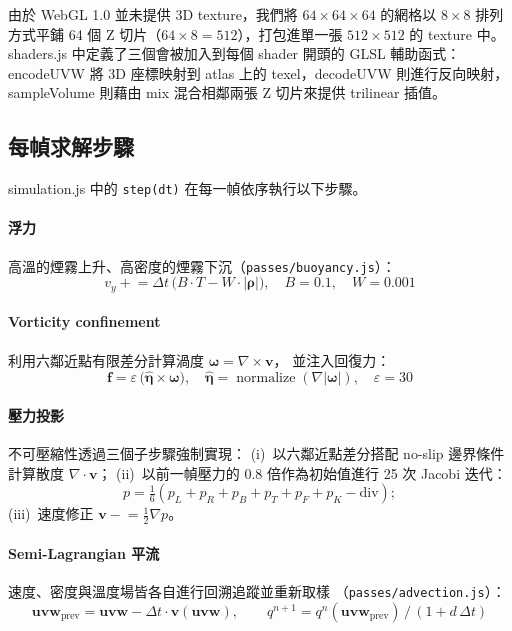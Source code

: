 \documentclass[a4paper, 12pt]{article}
\begin{document}
由於 WebGL 1.0 並未提供 3D texture，我們將 $64\times64\times64$ 的網格以
$8\times8$ 排列方式平鋪 64 個 Z 切片（$64\times8=512$），打包進單一張
$512\times512$ 的 texture 中。
shaders.js 中定義了三個會被加入到每個 shader 開頭的 GLSL 輔助函式：
encodeUVW 將 3D 座標映射到 atlas 上的 texel，decodeUVW 則進行反向映射，
sampleVolume 則藉由 mix 混合相鄰兩張 Z 切片來提供 trilinear 插值。

\subsection{每幀求解步驟}

simulation.js 中的 \texttt{step(dt)} 在每一幀依序執行以下步驟。

\paragraph{浮力}
高溫的煙霧上升、高密度的煙霧下沉（\texttt{passes/buoyancy.js}）：
\[
  v_y \mathrel{+}= \Delta t\,\bigl(B\cdot T - W\cdot|\boldsymbol{\rho}|\bigr),
  \quad B=0.1,\quad W=0.001
\]

\paragraph{Vorticity confinement}
利用六鄰近點有限差分計算渦度 $\boldsymbol{\omega}=\nabla\times\mathbf{v}$，
並注入回復力：
\[
  \mathbf{f} = \varepsilon\,\bigl(\hat{\boldsymbol{\eta}}\times\boldsymbol{\omega}\bigr),
  \quad \hat{\boldsymbol{\eta}} = \operatorname{normalize}(\nabla|\boldsymbol{\omega}|),
  \quad \varepsilon = 30
\]

\paragraph{壓力投影}
不可壓縮性透過三個子步驟強制實現：
(i)~以六鄰近點差分搭配 no-slip 邊界條件計算散度 $\nabla\cdot\mathbf{v}$；
(ii)~以前一幀壓力的 $0.8$ 倍作為初始值進行 25 次 Jacobi 迭代：
\[p = \tfrac{1}{6}(p_L+p_R+p_B+p_T+p_F+p_K - \mathrm{div});\]
(iii)~速度修正 $\mathbf{v}\mathrel{-}=\tfrac{1}{2}\nabla p$。

\paragraph{Semi-Lagrangian 平流}
速度、密度與溫度場皆各自進行回溯追蹤並重新取樣
（\texttt{passes/advection.js}）：
\[
  \mathbf{uvw}_{\text{prev}} = \mathbf{uvw} - \Delta t\cdot\mathbf{v}(\mathbf{uvw}),
  \qquad
  q^{n+1} = q^n(\mathbf{uvw}_{\text{prev}})\,/\,(1 + d\,\Delta t)
\]
\end{document}
